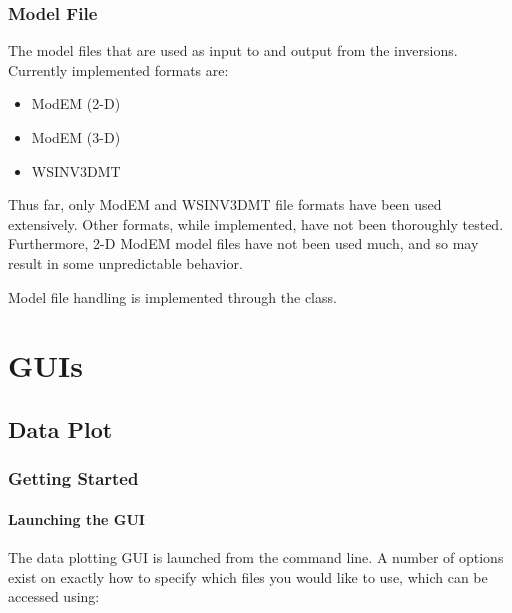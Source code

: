 \documentclass[letterpaper,10pt,english]{sphinxmanual}
\begin{document}
\subsection{Model File}
\label{\detokenize{content/api_core/input_files:model-file}}\label{\detokenize{content/api_core/input_files:id5}}
The model files that are used as input to and output from the inversions.
Currently implemented formats are:
\begin{itemize}
\item {} 
ModEM (2-D)

\item {} 
ModEM (3-D)

\item {} 
WSINV3DMT

\end{itemize}

Thus far, only ModEM and WSINV3DMT file formats have been used extensively. Other formats, while implemented, have not been thoroughly tested. Furthermore, 2-D ModEM model files have not been used much, and so may result in some unpredictable behavior.

Model file handling is implemented through the {\hyperref[\detokenize{content/api_core/data_structures:model}]{}} class.


\chapter{GUIs}
\label{\detokenize{index:guis}}

\section{Data Plot}
\label{\detokenize{index:data-plot}}

\subsection{Getting Started}
\label{\detokenize{content/data_plot/getting_started:getting-started}}\label{\detokenize{content/data_plot/getting_started::doc}}

\subsubsection{Launching the GUI}
\label{\detokenize{content/data_plot/getting_started:launching-the-gui}}
The data plotting GUI is launched from the command line. A number of options exist on exactly how to specify which files you would like to use, which can be accessed using:
\end{document}
